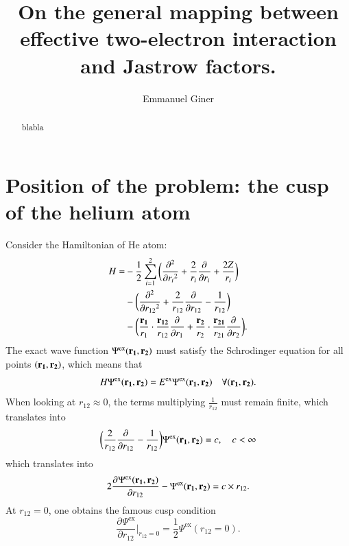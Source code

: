 \documentclass[aip,jcp,reprint,noshowkeys,superscriptaddress]{revtex4-1}
\newcommand{\deriv}[3]{\frac{\partial^{#3} #1}{\partial {#2}^{#3}}}
\newcommand{\bd}[1]{{\bf {#1}}}
\newcommand{\psiex}[0]{\Psi^{\text{ex}}}
\newcommand{\energyex}[0]{E^{\text{ex}}}
\begin{document}
	

\title{On the general mapping between effective two-electron interaction and Jastrow factors.}

\author{Emmanuel Giner}

\begin{abstract}
blabla

\end{abstract}

\maketitle
\section{Position of the problem: the cusp of the helium atom}
Consider the Hamiltonian of He atom: 
\begin{equation}
 \label{eq:h_he}
 \begin{aligned}
 H = &-\frac{1}{2} \sum_{i=1}^2 \bigg(\deriv{}{r_i}{2} + \frac{2}{r_i} \deriv{}{r_i}{} + \frac{2 Z}{r_i}\bigg) \\
     &-\bigg( \deriv{}{r_{12}}{2} + \frac{2}{r_{12}} \deriv{}{r_{12}}{} -\frac{1}{r_{12}}\bigg) \\
     &-\bigg( \frac{\bd{r_1}}{r_1} \cdot \frac{\bd{r_{12}} }{r_{12}}  \deriv{}{r_1}{} + 
              \frac{\bd{r_2}}{r_2} \cdot \frac{\bd{r_{21}} }{r_{21}}  \deriv{}{r_2}{} \bigg).
 \end{aligned}
\end{equation}
The exact wave function $\psiex(\bd{r_1},\bd{r_2})$ must satisfy the Schrodinger equation for all points $(\bd{r_1},\bd{r_2})$, which means that 
\begin{equation}
 H \psiex(\bd{r_1},\bd{r_2}) = \energyex \psiex(\bd{r_1},\bd{r_2}) \quad \forall (\bd{r_1},\bd{r_2}).
\end{equation}
When looking at $r_{12}\approx 0$, the terms multiplying $\frac{1}{r_{12}}$ must remain finite, which translates into 
\begin{equation}
 \bigg( \frac{2}{r_{12}} \deriv{}{r_{12}}{} -\frac{1}{r_{12}}\bigg) \psiex(\bd{r_1},\bd{r_2})  = c,\quad c<\infty 
\end{equation}
which translates into
\begin{equation}
 2 \deriv{\psiex(\bd{r_1},\bd{r_2})}{r_{12}}{} -\psiex(\bd{r_1},\bd{r_2})  = c\times r_{12}. 
\end{equation}
At $r_{12}=0$, one obtains the famous cusp condition
\begin{equation}
 \deriv{\psiex}{r_{12}}{}\Bigr|_{r_{12}=0} = \frac{1}{2} \psiex(r_{12}=0). 
\end{equation}
\end{document}
